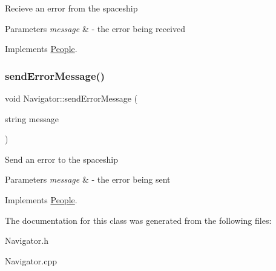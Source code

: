 Recieve an error from the spaceship 
\begin{DoxyParams}{Parameters}
{\em message} & -\/ the error being received \\
\hline
\end{DoxyParams}


Implements \hyperlink{classPeople_a0685df78be631783138865e03cc7c85d}{People}.

\mbox{\label{classNavigator_a72ce12655f579879aae63b118c906b91}} 
\subsubsection{\texorpdfstring{send\+Error\+Message()}{sendErrorMessage()}}
{\footnotesize\ttfamily void Navigator\+::send\+Error\+Message (\begin{DoxyParamCaption}\item[{string}]{message }\end{DoxyParamCaption})\hspace{0.3cm}{\ttfamily [virtual]}}

Send an error to the spaceship 
\begin{DoxyParams}{Parameters}
{\em message} & -\/ the error being sent \\
\hline
\end{DoxyParams}


Implements \hyperlink{classPeople_a572a35170f61d1848eb04b65baafb057}{People}.



The documentation for this class was generated from the following files\+:\begin{DoxyCompactItemize}
\item 
Navigator.\+h\item 
Navigator.\+cpp\end{DoxyCompactItemize}
